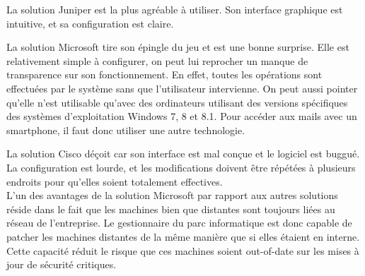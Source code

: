 \documentclass[11pt,a4paper]{article}
\begin{document}
La solution Juniper est la plus agréable à utiliser. 
Son interface graphique est intuitive, et sa configuration est claire.

La solution Microsoft tire son épingle du jeu et est une bonne surprise.
Elle est relativement simple à configurer, on peut lui reprocher un manque de transparence sur son fonctionnement.
En effet, toutes les opérations sont effectuées par le système sans que l'utilisateur intervienne.
On peut aussi pointer qu'elle n'est utilisable qu'avec des ordinateurs utilisant des versions spécifiques des systèmes d'exploitation Windows 7, 8 et 8.1.
Pour accéder aux mails avec un smartphone, il faut donc utiliser une autre technologie.

La solution Cisco déçoit car son interface est mal conçue et le logiciel est buggué.
La configuration est lourde, et les modifications doivent être répétées à plusieurs endroits pour qu'elles soient totalement effectives.\\

L'un des avantages de la solution Microsoft par rapport aux autres solutions réside dans le fait que les machines bien que distantes sont toujours liées au réseau de l'entreprise.
Le gestionnaire du parc informatique est donc capable de patcher les machines distantes de la même manière que si elles étaient en interne.
Cette capacité réduit le risque que ces machines soient out-of-date sur les mises à jour de sécurité critiques.
\end{document}
